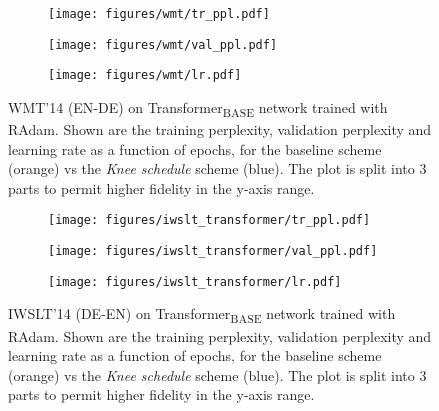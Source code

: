 \documentclass[twoside,11pt]{article}
\newcommand{\lrschedule}{\textit{Knee schedule}}
\begin{document}
\begin{figure}[h]
    \begin{subfigure}[t]{\textwidth}
        \centering
        \texttt{[image: figures/wmt/tr\_ppl.pdf]}
\label{fig:wmt_tr_loss}
    \end{subfigure}
    \begin{subfigure}[t]{\textwidth}
        \centering
        \texttt{[image: figures/wmt/val\_ppl.pdf]}
\label{fig:wmt_test_acc}
    \end{subfigure}
    \begin{subfigure}[t]{\textwidth}
        \centering
        \texttt{[image: figures/wmt/lr.pdf]}
\label{fig:wmt_lr}
    \end{subfigure}
\caption{WMT'14 (EN-DE) on Transformer\textsubscript{BASE} network trained with RAdam. Shown are the training perplexity, validation perplexity and learning rate as a function of epochs, for the baseline scheme (orange) vs the \lrschedule{} scheme (blue). The plot is split into 3 parts to permit higher fidelity in the y-axis range.}
\label{fig:wmt_radam_lrl}
\end{figure}



\begin{figure}[h]
    \begin{subfigure}[t]{\textwidth}
        \centering
        \texttt{[image: figures/iwslt\_transformer/tr\_ppl.pdf]}
\label{fig:iwslt_adam_tr_loss}
    \end{subfigure}
    \begin{subfigure}[t]{\textwidth}
        \centering
        \texttt{[image: figures/iwslt\_transformer/val\_ppl.pdf]}
\label{fig:iwslt_adam_test_acc}
    \end{subfigure}
    \begin{subfigure}[t]{\textwidth}
        \centering
        \texttt{[image: figures/iwslt\_transformer/lr.pdf]}
\label{fig:iwslt_adam_lr}
    \end{subfigure}
\caption{IWSLT'14 (DE-EN) on Transformer\textsubscript{BASE} network trained with RAdam. Shown are the training perplexity, validation perplexity and learning rate as a function of epochs, for the baseline scheme (orange) vs the \lrschedule{} scheme (blue). The plot is split into 3 parts to permit higher fidelity in the y-axis range.}
\label{fig:iwslt_adam_result}
\end{figure}
\end{document}
